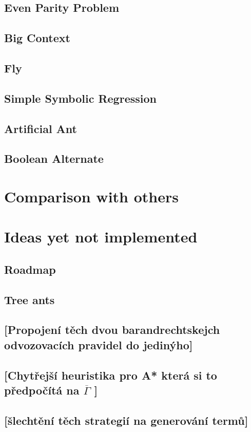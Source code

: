 \documentclass[12pt,a4paper]{report}
\begin{document}
	
		\section{Even Parity Problem}
		\section{Big Context}
		\section{Fly}
		\section{Simple Symbolic Regression}
		\section{Artificial Ant}
		\section{Boolean Alternate}
		
\chapter{Comparison with others}

\chapter{Ideas yet not implemented}

\section{Roadmap}
\section{Tree ants}
\section{[Propojení těch dvou barandrechtskejch odvozovacích pravidel do jedinýho]}
\section{[Chytřejší heuristika pro A* která si to předpočítá na $\overline{\Gamma}$ ]}
\section{[šlechtění těch strategií na generování termů]}
\end{document}
